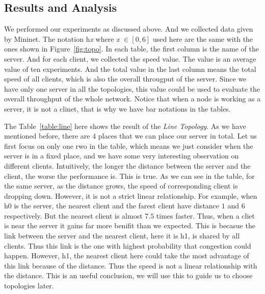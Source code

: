 \subsection{Results and Analysis} \label{subsec:result}
We performed our experiments as discussed above. And we collected data given by Mininet.
The notation h{\it x} where {\it x} $\in [0, 6]$ used here are the same with the ones 
shown in Figure~\ref{fig:topo}. In each table, the first column is the name of the server.
And for each client, we collected the speed value. The value is an average value of ten
experiments. And the total value in the last column means the total speed of all clients, 
which is also the overall througput of the server. Since we have only one server in all the 
topologies, this value could be used to evaluate the overall throughput of the whole network. 
Notice that when a node is working as a server, it is not a clinet, that is why we have bar 
notations in the tables.

The Table~\ref{table:line} here shows the result of the {\it Line Topology}. As we have 
mentioned before, there are 4 places that we can place our server in total. Let us first 
focus on only one rwo in the table, which means we just consider when the server is in a fixed
place, and we have some very interesting observation on different clients. Intuitively, 
the longer the distance between the server and the client, the worse the performance is. 
This is true. As we can see in the table, for the same server, as the distance grows, 
the speed of corresponding client is dropping down. However, it is not a strict linear 
relationship. For example, when h0 is the server, the nearest client 
and the farest client have distance $1$ and $6$ respectively. But the nearest client is 
almost $7.5$ times faster. Thus, when a cliet is near the server it gains far more benifit
than we expected. This is becasue the link between the server and the nearest client, here
it is h1, is shared by all clients. Thus this link is the one with highest probability that 
congestion could happen. However, h1, the nearest client here could take the most advantage of
this link because of the distance. Thus the speed is not a linear relationship with the distance.
This is an useful conclusion, we will use this to guide us to choose topologies later.

